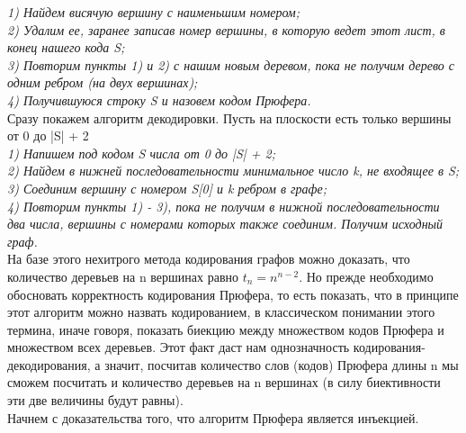 \documentclass[12pt]{article}
\begin{document}
\textit{1) Найдем висячую вершину с наименьшим номером;} \\

\textit{2) Удалим ее, заранее записав номер вершины, в которую ведет этот лист, в конец нашего кода S;} \\

\textit{3) Повторим пункты 1) и 2) с нашим новым деревом, пока не получим дерево с одним ребром (на двух вершинах);} \\

\textit{4) Получившуюся строку S и назовем кодом Прюфера.} \\

Сразу покажем алгоритм декодировки. Пусть на плоскости есть только вершины от 0 до |S| + 2\\

\textit{1) Напишем под кодом S числа от 0 до |S| + 2;} \\

\textit{2) Найдем в нижней последовательности минимальное число k, не входящее в S;} \\

\textit{3) Соединим вершину с номером S[0] и k ребром в графе;} \\

\textit{4) Повторим пункты 1) - 3), пока не получим в нижной последовательности два числа, вершины с номерами которых также соединим. Получим исходный граф.} \\

На базе этого нехитрого метода кодирования графов можно доказать, что количество деревьев на n вершинах равно \(t_{n} = n^{n-2}\). Но прежде необходимо обосновать корректность кодирования Прюфера, то есть показать, что в принципе этот алгоритм можно назвать кодированием, в классическом понимании этого термина, иначе говоря, показать биекцию между множеством кодов Прюфера и множеством всех деревьев. Этот факт даст нам однозначность кодирования-декодирования, а значит, посчитав количество слов (кодов) Прюфера длины n мы сможем посчитать и количество деревьев на n вершинах (в силу биективности эти две величины будут равны).\\

Начнем с доказательства того, что алгоритм Прюфера является инъекцией. \\
\end{document}
